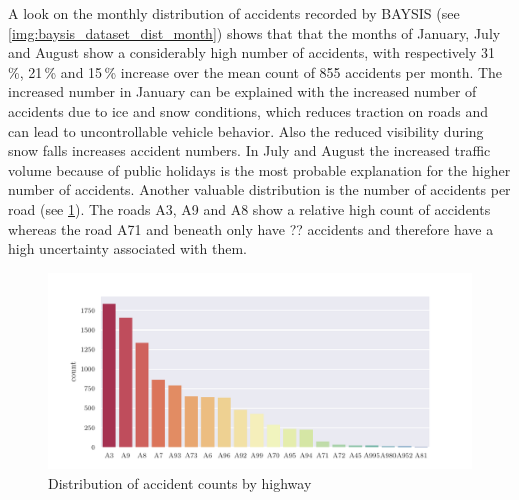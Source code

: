 A look on the monthly distribution of accidents recorded by BAYSIS (see \cref{img:baysis_dataset_dist_month}) shows that that the months of January, July and August show a considerably high number of accidents, with respectively 31\,\%, 21\,\% and 15\,\% increase over the mean count of 855 accidents per month. The increased number in January can be explained with the increased number of accidents due to ice and snow conditions, which reduces traction on roads and can lead to uncontrollable vehicle behavior. Also the reduced visibility during snow falls increases accident numbers. In July and August the increased traffic volume because of public holidays is the most probable explanation for the higher number of accidents. Another valuable distribution is the number of accidents per road (see \cref{img:baysis_dataset_dist_highway}). The roads A3, A9 and A8 show a relative high count of accidents whereas the road A71 and beneath only have ?? accidents and therefore have a high uncertainty associated with them. 
\begin{figure}[ht]
	\centering
	\includegraphics[scale=0.75]{CorrAnalysis/data/BAYSIS/01_dataset/plots/baysis_dataset_hist_highway}
	\caption{Distribution of accident counts by highway}
	\label{img:baysis_dataset_dist_highway}
	\vspace{-8mm}
\end{figure}
